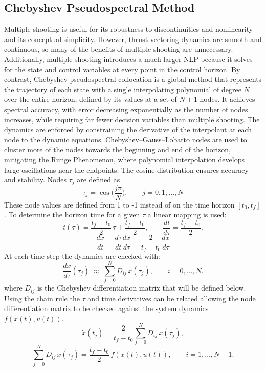 \documentclass[]{article}
\begin{document}
\subsection*{Chebyshev Pseudospectral Method}
Multiple shooting is useful for its robustness to discontinuities and nonlinearity and its conceptual simplicity. However, thrust-vectoring dynamics are smooth and continuous, so many of the benefits of multiple shooting are unnecessary. Additionally, multiple shooting introduces a much larger NLP because it solves for the state and control variables at every point in the control horizon. By contrast, Chebyshev pseudospectral collocation \citep{chebyshevPS} is a global method that represents the trajectory of each state with a single interpolating polynomial of degree $N$ over the entire horizon, defined by its values at a set of $N+1$ nodes. It achieves spectral accuracy, with error decreasing exponentially as the number of nodes increases, while requiring far fewer decision variables than multiple shooting. The dynamics are enforced by constraining the derivative of the interpolant at each node to the dynamic equations. Chebyshev–Gauss–Lobatto nodes are used to cluster more of the nodes towards the beginning and end of the horizon, mitigating the Runge Phenomenon, where polynomial interpolation develops large oscillations near the endpoints. The cosine distribution ensures accuracy and stability. Nodes $\tau_j$ are defined as
	\[
        \tau_j = \cos{\Big(\frac{j\pi}{N}\Big)},\qquad j = 0,1,...,N
        \]
 These node values are defined from 1 to -1 instead of on the time horizon $[t_0 , t_f]$. To determine the horizon time for a given $\tau$ a linear mapping is used:
         \[
        t(\tau) = \frac{t_f-t_0}{2}\,\tau + \frac{t_f+t_0}{2}, 
        \qquad 
        \frac{dt}{d\tau} = \frac{t_f-t_0}{2}.
        \]
        \[
        \frac{dx}{dt}=\frac{d\tau}{dt}\frac{dx}{d\tau}=\frac{2}{t_f-t_0}\frac{dx}{d\tau}
        \]
At each time step the dynamics are checked with:
        \[
        \frac{dx}{d\tau}(\tau_j) \;\approx\; \sum_{j=0}^N D_{ij}\,x(\tau_j), 
        \qquad i=0,\dots,N.
        \]
where $D_{ij}$ is the Chebyshev differentiation matrix that will be defined below. Using the chain rule the $\tau$ and time derivatives can be related allowing the node differentiation matrix to be checked against the system dynamics $f(x(t), u(t))$.
        \[
       \dot{x}(t_j)= \frac{2}{t_f-t_0}\sum_{j=0}^N D_{ij}\,x(\tau_j), 
        \]
        \[
        \sum_{j=0}^N D_{ij}\,x(\tau_j)
        = \frac{t_f-t_0}{2}\, f(x(t),u(t)), 
        \qquad i=1,\dots,N-1.
        \]
\end{document}
